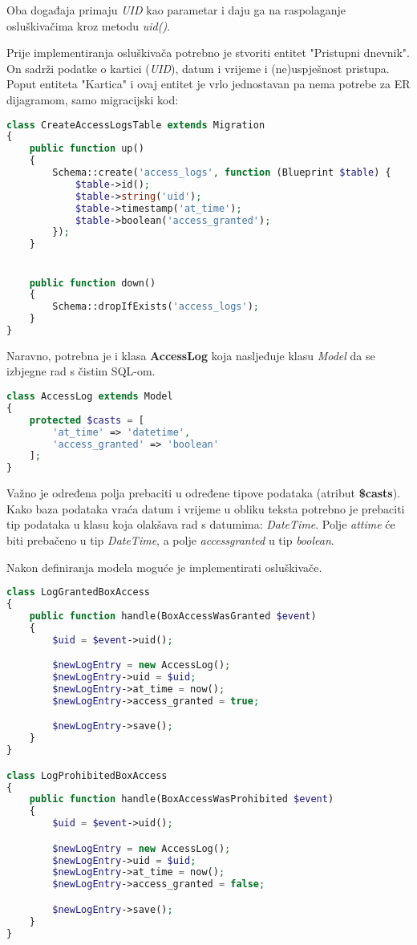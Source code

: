 Oba događaja primaju \textit{UID} kao parametar i daju ga na raspolaganje osluškivačima kroz metodu \textit{uid()}.

Prije implementiranja osluškivača potrebno je stvoriti entitet "Pristupni dnevnik".
On sadrži podatke o kartici (\textit{UID}), datum i vrijeme i (ne)uspješnost pristupa.
Poput entiteta "Kartica" i ovaj entitet je vrlo jednostavan pa nema potrebe za ER dijagramom, samo migracijski kod:

\begin{lstlisting}[language=PHP]
class CreateAccessLogsTable extends Migration
{
    public function up()
    {
        Schema::create('access_logs', function (Blueprint $table) {
            $table->id();
            $table->string('uid');
            $table->timestamp('at_time');
            $table->boolean('access_granted');
        });
    }


    public function down()
    {
        Schema::dropIfExists('access_logs');
    }
}
\end{lstlisting}

Naravno, potrebna je i klasa \textbf{AccessLog} koja nasljeđuje klasu \textit{Model} da se izbjegne rad s čistim SQL-om.

\begin{lstlisting}[language=PHP]
class AccessLog extends Model
{
    protected $casts = [
        'at_time' => 'datetime',
        'access_granted' => 'boolean'
    ];
}
\end{lstlisting}

Važno je određena polja prebaciti u određene tipove podataka (atribut \textbf{\$casts}).
Kako baza podataka vraća datum i vrijeme u obliku teksta potrebno je prebaciti tip podataka u klasu koja olakšava rad s datumima:
\textit{DateTime}.
Polje \textit{at\textunderscore time} će biti prebačeno u tip \textit{DateTime}, a polje \textit{access\textunderscore granted} u tip \textit{boolean}.


Nakon definiranja modela moguće je implementirati osluškivače.

\begin{lstlisting}[language=PHP]
class LogGrantedBoxAccess
{
    public function handle(BoxAccessWasGranted $event)
    {
        $uid = $event->uid();

        $newLogEntry = new AccessLog();
        $newLogEntry->uid = $uid;
        $newLogEntry->at_time = now();
        $newLogEntry->access_granted = true;

        $newLogEntry->save();
    }
}

class LogProhibitedBoxAccess
{
    public function handle(BoxAccessWasProhibited $event)
    {
        $uid = $event->uid();

        $newLogEntry = new AccessLog();
        $newLogEntry->uid = $uid;
        $newLogEntry->at_time = now();
        $newLogEntry->access_granted = false;

        $newLogEntry->save();
    }
}
\end{lstlisting}

